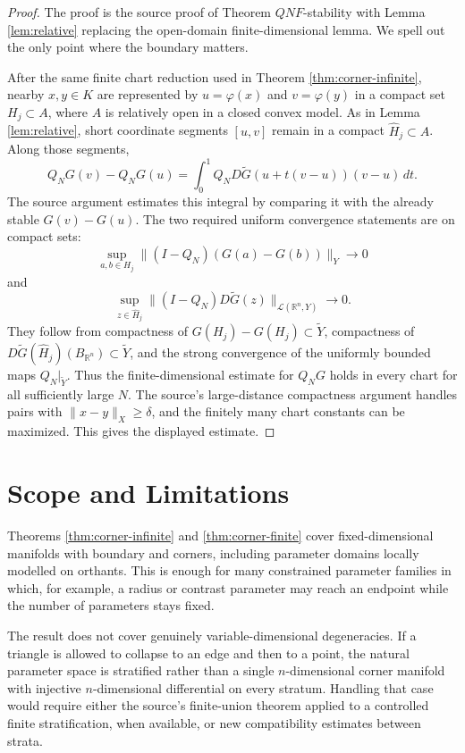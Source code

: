\documentclass[11pt]{article}
\newcommand{\R}{\mathbb R}
\begin{document}
\begin{proof}
The proof is the source proof of Theorem \(QNF\)-stability with Lemma \ref{lem:relative} replacing the open-domain finite-dimensional lemma.  We spell out the only point where the boundary matters.

After the same finite chart reduction used in Theorem \ref{thm:corner-infinite}, nearby \(x,y\in K\) are represented by \(u=\varphi(x)\) and \(v=\varphi(y)\) in a compact set \(H_j\subset A\), where \(A\) is relatively open in a closed convex model.  As in Lemma \ref{lem:relative}, short coordinate segments \([u,v]\) remain in a compact \(\widehat H_j\subset A\).  Along those segments,
\[
  Q_NG(v)-Q_NG(u)
  =
  \int_0^1 Q_ND\widetilde G(u+t(v-u))(v-u)\,dt.
\]
The source argument estimates this integral by comparing it with the already stable \(G(v)-G(u)\).  The two required uniform convergence statements are on compact sets:
\[
  \sup_{a,b\in H_j}\|(I-Q_N)(G(a)-G(b))\|_Y\to0
\]
and
\[
  \sup_{z\in\widehat H_j}\|(I-Q_N)D\widetilde G(z)\|_{\mathcal L(\R^n,Y)}\to0.
\]
They follow from compactness of \(G(H_j)-G(H_j)\subset\widetilde Y\), compactness of \(D\widetilde G(\widehat H_j)(B_{\R^n})\subset\widetilde Y\), and the strong convergence of the uniformly bounded maps \(Q_N|_{\widetilde Y}\).  Thus the finite-dimensional estimate for \(Q_NG\) holds in every chart for all sufficiently large \(N\).  The source's large-distance compactness argument handles pairs with \(\|x-y\|_X\ge\delta\), and the finitely many chart constants can be maximized.  This gives the displayed estimate.
\end{proof}

\section{Scope and Limitations}

Theorems \ref{thm:corner-infinite} and \ref{thm:corner-finite} cover fixed-dimensional manifolds with boundary and corners, including parameter domains locally modelled on orthants.  This is enough for many constrained parameter families in which, for example, a radius or contrast parameter may reach an endpoint while the number of parameters stays fixed.

The result does not cover genuinely variable-dimensional degeneracies.  If a triangle is allowed to collapse to an edge and then to a point, the natural parameter space is stratified rather than a single \(n\)-dimensional corner manifold with injective \(n\)-dimensional differential on every stratum.  Handling that case would require either the source's finite-union theorem applied to a controlled finite stratification, when available, or new compatibility estimates between strata.
\end{document}
